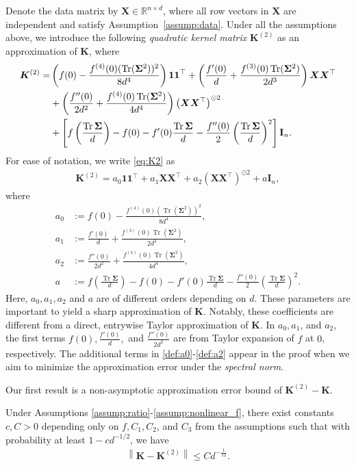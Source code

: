 \documentclass[twoside,11pt]{article}
\newcommand{\norm}[1]{\left\|#1\right\|}
\newcommand{\R}{\mathbb{R}}
\def\bI{{\mathbf I}}
\def\bK{{\boldsymbol K}}
\def\bX{{\boldsymbol X}}
\def\bSigma{{\boldsymbol \Sigma}}
\newcommand{\bKquad}{\bK^{(2)}}
\renewcommand{\bK}{\boldsymbol{K}}
\newcommand{\Tr}{\operatorname{Tr}}
\newcommand{\1}{\mathbf{1}}
\def\tran{^\top}
\def\one{\mathbf{1}}
\begin{document}
Denote the data matrix by $\bX\in\R^{n\times d}$, where all row vectors in $\bX$ are independent and satisfy Assumption~\ref{assump:data}. Under all the assumptions above, we introduce the following \textit{quadratic kernel matrix} $\bK^{(2)}$ as an approximation of $\bK$, where
\begin{align}
\bKquad=&\left(f(0)-\frac{f^{(4)}(0)(\Tr(\bSigma^2))^2}{8d^4}\right)\mathbf{1}\mathbf{1}^\top+\left(\frac{f'(0)}{d}+\frac{f^{(3)}(0)\Tr(\bSigma^2)}{2d^3} \right)\bX\bX ^\top 
\\&+\left(\frac{f''(0)}{2d^2}+ \frac{f^{(4)}(0)\Tr(\bSigma^2)}{4d^4}\right)   \left(\bX\bX^\top \right)^{\odot 2} \notag\\
&+ \left[f\left(\frac{\Tr\bSigma}{d} \right)-f(0)-f'(0)\frac{\Tr\bSigma}{d}-\frac{f''(0)}{2}    \left(\frac{\Tr\bSigma}{d}\right)^2\right] \bI_n.     \label{eq:K2}
\end{align}
For ease of notation, we write \eqref{eq:K2} as
\begin{align}\label{eq:Kquad}
\bKquad= a_0 \one\one\tran + a_1 \bX\bX\tran + a_2 (\bX\bX\tran)^{\odot 2} + a\bI_n,
\end{align}
where
\begin{align}
    a_0 &:= f(0)-\frac{f^{(4)}(0)(\Tr(\bSigma^2))^2}{8d^4}, \label{def:a0}\\  
    a_1 &:= \frac{f'(0)}{d}+\frac{f^{(3)}(0)\Tr(\bSigma^2)}{2d^3}, \label{def:a1}\\
    a_2 &:= \frac{f''(0)}{2d^2}+ \frac{f^{(4)}(0)\Tr(\bSigma^2)}{4d^4}, \label{def:a2}\\
    a &:= f\left(\frac{\Tr\bSigma}{d} \right)-f(0)-f'(0)\frac{\Tr\bSigma}{d}-\frac{f''(0)}{2}    \left(\frac{\Tr\bSigma}{d}\right)^2.\label{def:a}
\end{align}
Here, $a_0,a_1,a_2$ and $a$ are of different orders depending on $d$. These parameters are important to yield a sharp approximation of $\bK$. Notably, these coefficients are different from a direct, entrywise Taylor approximation of $\bK$. In $a_0, a_1$, and $a_2$, the first terms $f(0), \frac{f'(0)}{d}, $ and $\frac{f''(0)}{2d^2}$ are from Taylor expansion of $f$ at $0$, respectively. The additional terms in \eqref{def:a0}-\eqref{def:a2} appear in the proof when we aim to minimize the approximation error under the \textit{spectral norm}. 

Our first result is a non-asymptotic approximation error bound of $\bKquad-\bK$. 
\begin{theorem}\label{thm:concentration}
Under Assumptions \ref{assump:ratio}-\ref{assump:nonlinear_f}, there exist constants $c,C>0$ depending only on $f, C_1,C_2$, and $C_3$ from the assumptions such that with probability at least $1-cd^{-1/2}$, we have 
    \begin{align}\label{eq:K_matrix}
        \norm{\bK-\bKquad}\leq Cd^{-\frac{1}{12}}.
    \end{align}
\end{theorem}
 
\end{document}
